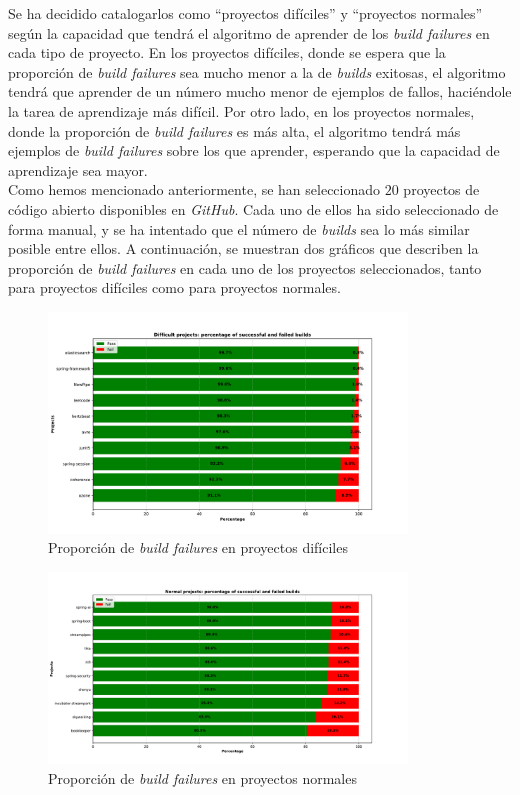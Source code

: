 Se ha decidido catalogarlos como ``proyectos difíciles'' y ``proyectos normales'' según la
capacidad que tendrá el algoritmo de aprender de los \textit{build failures} en cada tipo de 
proyecto. En los proyectos difíciles, donde se espera que la proporción de \textit{build
failures} sea mucho menor a la de \textit{builds} exitosas, el algoritmo tendrá que aprender
de un número mucho menor de ejemplos de fallos, haciéndole la tarea de aprendizaje más difícil.
Por otro lado, en los proyectos normales, donde la proporción de \textit{build failures} es
más alta, el algoritmo tendrá más ejemplos de \textit{build failures} sobre los que aprender,
esperando que la capacidad de aprendizaje sea mayor.\\

Como hemos mencionado anteriormente, se han seleccionado $20$ proyectos de código abierto
disponibles en \textit{GitHub}. Cada uno de ellos ha sido seleccionado de forma manual, y se
ha intentado que el número de \textit{builds} sea lo más similar posible entre ellos. A
continuación, se muestran dos gráficos que describen la proporción de \textit{build failures}
en cada uno de los proyectos seleccionados, tanto para proyectos difíciles como para proyectos
normales.\\

\begin{figure}[H]
    \centering
    \includegraphics[width=0.85\textwidth]{images/Failures_difficult_projects.pdf}
    \caption{Proporción de \textit{build failures} en proyectos difíciles}
    \label{fig:failures_difficult_projects}
\end{figure}

\begin{figure}[H]
    \centering
    \includegraphics[width=0.85\textwidth]{images/Failures_normal_projects.pdf}
    \caption{Proporción de \textit{build failures} en proyectos normales}
    \label{fig:failures_normal_projects}
\end{figure}

